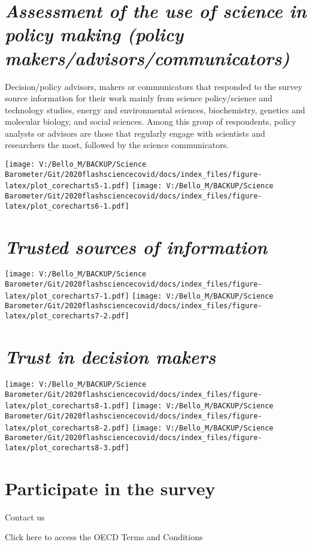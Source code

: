 \documentclass[
]{article}
\begin{document}
\hypertarget{assessment-of-the-use-of-science-in-policy-making-policy-makersadvisorscommunicators}{%
\section{\texorpdfstring{\emph{Assessment of the use of science in
policy making (policy
makers/advisors/communicators)}}{Assessment of the use of science in policy making (policy makers/advisors/communicators)}}\label{assessment-of-the-use-of-science-in-policy-making-policy-makersadvisorscommunicators}}

Decision/policy advisors, makers or communicators that responded to the
survey source information for their work mainly from science
policy/science and technology studies, energy and environmental
sciences, biochemistry, genetics and molecular biology, and social
sciences. Among this group of respondents, policy analysts or advisors
are those that regularly engage with scientists and researchers the
most, followed by the science communicators.

\texttt{[image: V:/Bello\_M/BACKUP/Science Barometer/Git/2020flashsciencecovid/docs/index\_files/figure-latex/plot\_corecharts5-1.pdf]}
\texttt{[image: V:/Bello\_M/BACKUP/Science Barometer/Git/2020flashsciencecovid/docs/index\_files/figure-latex/plot\_corecharts6-1.pdf]}

\hypertarget{trusted-sources-of-information}{%
\section{\texorpdfstring{\emph{Trusted sources of
information}}{Trusted sources of information}}\label{trusted-sources-of-information}}

\texttt{[image: V:/Bello\_M/BACKUP/Science Barometer/Git/2020flashsciencecovid/docs/index\_files/figure-latex/plot\_corecharts7-1.pdf]}
\texttt{[image: V:/Bello\_M/BACKUP/Science Barometer/Git/2020flashsciencecovid/docs/index\_files/figure-latex/plot\_corecharts7-2.pdf]}

\hypertarget{trust-in-decision-makers}{%
\section{\texorpdfstring{\emph{Trust in decision
makers}}{Trust in decision makers}}\label{trust-in-decision-makers}}

\texttt{[image: V:/Bello\_M/BACKUP/Science Barometer/Git/2020flashsciencecovid/docs/index\_files/figure-latex/plot\_corecharts8-1.pdf]}
\texttt{[image: V:/Bello\_M/BACKUP/Science Barometer/Git/2020flashsciencecovid/docs/index\_files/figure-latex/plot\_corecharts8-2.pdf]}
\texttt{[image: V:/Bello\_M/BACKUP/Science Barometer/Git/2020flashsciencecovid/docs/index\_files/figure-latex/plot\_corecharts8-3.pdf]}

\hypertarget{participate-in-the-survey}{%
\section{Participate in the survey}\label{participate-in-the-survey}}

Contact us

Click here to access the OECD Terms and Conditions
\end{document}
